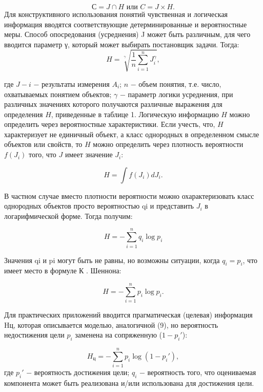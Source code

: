\documentclass[a4paper,12pt]{report}
\begin{document}
	\begin{equation}
\label{trivial}
 С = J \cap  H \mbox{ или } C = J \times H.		
\end{equation}						
	Для конструктивного использования понятий чувственная и логическая информация вводятся соответствующие детерминированные и вероятностные меры. Способ опосредования (усреднения) J может быть различным, для чего вводится параметр γ, который может выбирать постановщик задачи. Тогда:
	\begin{equation}
\label{trivial}
 H = \sqrt[ \gamma ]{ \frac{1}{n} \sum_{i = 1}^n J_i^\gamma}  , 
\end{equation}										 

где $J-i$ − результаты измерения $A_i$; $n$ − объем понятия, т.е. число, охватываемых понятием объектов; $\gamma$ − параметр логики усреднения, при различных значениях которого получаются различные выражения для определения $H$, приведенные в таблице 1.
	Логическую информацию $H$ можно определить через вероятностные характеристики. Если учесть, что, $H$ характеризует не единичный объект, а класс однородных в определенном смысле объектов или свойств, то $H$ можно определить через плотность вероятности $f(J_i)$ того, что $J$ имеет значение $J_i$:

	\begin{equation}
\label{trivial}
H = \int f( J_i)dJ_i  .
\end{equation} 										

	В частном случае вместо плотности вероятности можно охарактеризовать класс однородных объектов просто вероятностью qi и представить $J_i$ в логарифмической форме. Тогда получим:

	\begin{equation}
\label{trivial}
H =  -\sum_{i = 1}^{n}q_i \log p_i
\end{equation} 

Значения qi и pi могут быть не равны, но возможны ситуации, когда $q_i = p_i$, что имеет место в формуле К . Шеннона:

	\begin{equation}
\label{trivial}
H =  -\sum_{i = 1}^{n}p_i \log p_i.
\end{equation} 									      

	Для практических приложений вводится прагматическая (целевая) информация Hц, которая описывается моделью, аналогичной (9), но вероятность недостижения цели $p_i$ заменена на сопряженную ($1 - p_i'$):

	\begin{equation}
\label{trivial}
H_ц = - \sum_{i=1}^{ n} p_i \log (1 - p_i'),
\end{equation} 
где $p_i'$ − вероятность достижения цели; $q_i$ − вероятность того, что оцениваемая компонента может быть реализована и/или использована для достижения цели.\\
\end{document}
